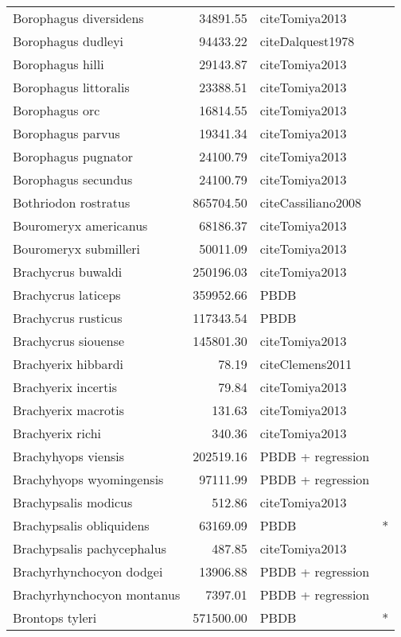 \begin{table}[ht]
\begin{tabular}{lrll}
  Borophagus diversidens & 34891.55 & cite{Tomiya2013} &  \\ 
  Borophagus dudleyi & 94433.22 & cite{Dalquest1978} &  \\ 
  Borophagus hilli & 29143.87 & cite{Tomiya2013} &  \\ 
  Borophagus littoralis & 23388.51 & cite{Tomiya2013} &  \\ 
  Borophagus orc & 16814.55 & cite{Tomiya2013} &  \\ 
  Borophagus parvus & 19341.34 & cite{Tomiya2013} &  \\ 
  Borophagus pugnator & 24100.79 & cite{Tomiya2013} &  \\ 
  Borophagus secundus & 24100.79 & cite{Tomiya2013} &  \\ 
  Bothriodon rostratus & 865704.50 & cite{Cassiliano2008} &  \\ 
  Bouromeryx americanus & 68186.37 & cite{Tomiya2013} &  \\ 
  Bouromeryx submilleri & 50011.09 & cite{Tomiya2013} &  \\ 
  Brachycrus buwaldi & 250196.03 & cite{Tomiya2013} &  \\ 
  Brachycrus laticeps & 359952.66 & PBDB &  \\ 
  Brachycrus rusticus & 117343.54 & PBDB &  \\ 
  Brachycrus siouense & 145801.30 & cite{Tomiya2013} &  \\ 
  Brachyerix hibbardi & 78.19 & cite{Clemens2011} &  \\ 
  Brachyerix incertis & 79.84 & cite{Tomiya2013} &  \\ 
  Brachyerix macrotis & 131.63 & cite{Tomiya2013} &  \\ 
  Brachyerix richi & 340.36 & cite{Tomiya2013} &  \\ 
  Brachyhyops viensis & 202519.16 & PBDB + regression &  \\ 
  Brachyhyops wyomingensis & 97111.99 & PBDB + regression &  \\ 
  Brachypsalis modicus & 512.86 & cite{Tomiya2013} &  \\ 
  Brachypsalis obliquidens & 63169.09 & PBDB & * \\ 
  Brachypsalis pachycephalus & 487.85 & cite{Tomiya2013} &  \\ 
  Brachyrhynchocyon dodgei & 13906.88 & PBDB + regression &  \\ 
  Brachyrhynchocyon montanus & 7397.01 & PBDB + regression &  \\ 
  Brontops tyleri & 571500.00 & PBDB & * \\ 

\end{tabular}
\end{table}
